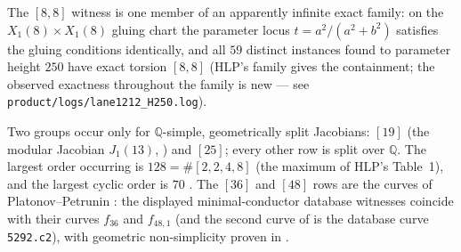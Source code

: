 \documentclass[11pt]{amsart}
\begin{document}
The $[8,8]$ witness is one member of an apparently infinite exact family: on
the $X_1(8)\times X_1(8)$ gluing chart the parameter locus $t=a^2/(a^2+b^2)$
satisfies the gluing conditions identically, and all $59$ distinct instances
found to parameter height $250$ have exact torsion $[8,8]$ (HLP's family gives
the containment; the observed exactness throughout the family is new --- see
\texttt{product/logs/lane1212\_H250.log}).

Two groups occur only for $\mathbb{Q}$-simple, geometrically split Jacobians:
$[19]$ (the modular Jacobian $J_1(13)$, \cite{MazurTate1973}) and $[25]$;
every other row is split over $\mathbb{Q}$.  The largest order occurring is
$128 = \#[2,2,4,8]$ (the maximum of HLP's Table~1), and the largest cyclic
order is $70$ \cite{Howe2015}.  The $[36]$ and $[48]$ rows are the curves of
Platonov--Petrunin \cite{PP2012b}: the displayed minimal-conductor database
witnesses coincide with their curves $f_{36}$ and $f_{48,1}$ (and the second
curve of \cite{PP2012b} is the database curve \texttt{5292.c2}), with
geometric non-simplicity proven in \cite[\S7]{Platonov2014}.
\medskip
\end{document}
